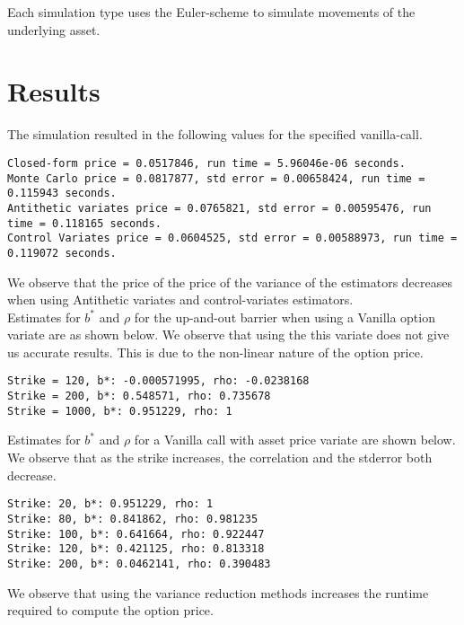 \documentclass[letterpaper,twoside,11pt,fleqn]{article}
\begin{document}
Each simulation type uses the Euler-scheme to simulate movements of the underlying asset.

\section*{Results}
The simulation resulted in the following values for the specified vanilla-call.
\begin{verbatim}
Closed-form price = 0.0517846, run time = 5.96046e-06 seconds.
Monte Carlo price = 0.0817877, std error = 0.00658424, run time = 0.115943 seconds.
Antithetic variates price = 0.0765821, std error = 0.00595476, run time = 0.118165 seconds.
Control Variates price = 0.0604525, std error = 0.00588973, run time = 0.119072 seconds.
\end{verbatim} 

We observe that the price of the price of the variance of the estimators decreases when using Antithetic variates and control-variates estimators. \\ 

Estimates for \(b^*\) and \(\rho\) for the up-and-out barrier when using a Vanilla option variate are as shown below. We observe that using the this variate does not give us accurate results. This is due to the non-linear nature of the option price.
\begin{verbatim}
Strike = 120, b*: -0.000571995, rho: -0.0238168
Strike = 200, b*: 0.548571, rho: 0.735678
Strike = 1000, b*: 0.951229, rho: 1
\end{verbatim}

Estimates for \(b^*\) and \(\rho\) for a Vanilla call with asset price variate are shown below. We observe that as the strike increases, the correlation and the stderror both decrease.
\begin{verbatim}
Strike: 20, b*: 0.951229, rho: 1
Strike: 80, b*: 0.841862, rho: 0.981235
Strike: 100, b*: 0.641664, rho: 0.922447
Strike: 120, b*: 0.421125, rho: 0.813318
Strike: 200, b*: 0.0462141, rho: 0.390483
\end{verbatim}

We observe that using the variance reduction methods increases the runtime required to compute the option price.
\clearpage
\vfill
\pagebreak
\end{document}
